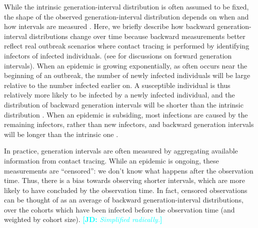 \documentclass[12pt]{article}
\newcommand{\comment}[3]{\textcolor{#1}{\textbf{[#2: }\textsl{#3}\textbf{]}}}
\newcommand{\jd}[1]{\comment{cyan}{JD}{#1}}
\begin{document}
While the intrinsic generation-interval distribution is often assumed to be fixed, the shape of the observed generation-interval distribution depends on when and how intervals are measured \citep{kenah2008generation, nishiura2010time, tomba2010some, champredon2015intrinsic, britton2019estimation}. 
Here, we briefly describe how backward generation-interval distributions change over time because backward measurements better reflect real outbreak scenarios where contact tracing is performed by identifying infectors of infected individuals. (see \cite{kenah2008generation, nishiura2010time, tomba2010some, champredon2015intrinsic} for discussions on forward generation intervals).
When an epidemic is growing exponentially, as often occurs near the beginning of an outbreak, the number of newly infected individuals will be large relative to the number infected earlier on. 
A susceptible individual is thus relatively more likely to be infected by a newly infected individual, 
and the distribution of backward generation intervals will be shorter than the intrinsic distribution \citep{nishiura2010time, champredon2015intrinsic, britton2019estimation}.
When an epidemic is subsiding, most infections are caused by the remaining infectors, rather than new infectors, and backward generation intervals will be longer than the intrinsic one \citep{nishiura2010time, tomba2010some, champredon2015intrinsic}.

In practice, generation intervals are often measured by aggregating available information from contact tracing. 
While an epidemic is ongoing, these measurements are ``censored'': we don't know what happens after the observation time.
Thus, there is a bias towards observing shorter intervals, which are more likely to have concluded by the observation time.
In fact, censored observations can be thought of as an average of backward generation-interval distributions, over the cohorts which have been infected before the observation time (and weighted by cohort size).
\jd{Simplified radically.}
\end{document}
